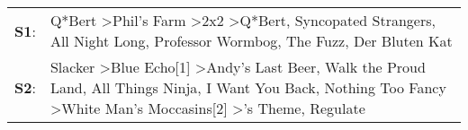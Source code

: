 \begin{supertabular}{p{0.03\textwidth}p{0.92\textwidth}}
 \textbf{S1}:  &                                                                                        Q*Bert\textsuperscript{} \textgreater \enspace Phil's Farm\textsuperscript{} \textgreater \enspace 2x2\textsuperscript{} \textgreater \enspace Q*Bert\textsuperscript{}, \enspace Syncopated Strangers\textsuperscript{}, \enspace All Night Long\textsuperscript{}, \enspace Professor Wormbog\textsuperscript{}, \enspace The Fuzz\textsuperscript{}, \enspace Der Bluten Kat\textsuperscript{}  \enspace  \\
 \textbf{S2}:  &  Slacker\textsuperscript{} \textgreater \enspace Blue Echo[1]\textsuperscript{} \textgreater \enspace Andy's Last Beer\textsuperscript{}, \enspace Walk the Proud Land\textsuperscript{}, \enspace All Things Ninja\textsuperscript{}, \enspace I Want You Back\textsuperscript{}, \enspace Nothing Too Fancy\textsuperscript{} \textgreater \enspace White Man's Moccasins[2]\textsuperscript{} \textgreater {}'s Theme\textsuperscript{}, \enspace Regulate\textsuperscript{}  \enspace  \\
\end{supertabular}
